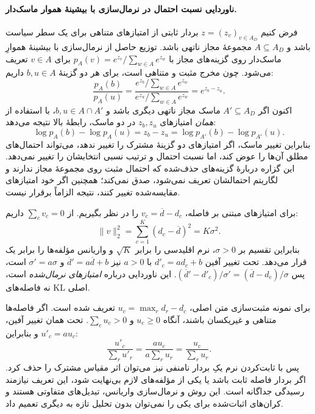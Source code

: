 \paragraph{ناوردایی نسبت احتمال در نرمال‌سازی با بیشینهٔ هموار ماسک‌دار.}
فرض کنیم $z=(z_v)_{v\in A_D}$ بردار ثابتی از امتیازهای متناهی
برای یک سطر سیاست باشد و $A\subseteq A_D$ مجموعهٔ مجاز ناتهی باشد.
توزیع حاصل از نرمال‌سازی با بیشینهٔ هموارِ ماسک‌دار روی گزینه‌های مجاز با
$p_A(v)=e^{z_v}/\sum_{w\in A}e^{z_w}$ برای $v\in A$
تعریف می‌شود. چون مخرج مثبت و متناهی است،
برای هر دو گزینهٔ $b,u\in A$ داریم:
\begin{equation}\label{eq:app-ch3-softmax-mask-ratio}
\frac{p_A(b)}{p_A(u)}
=\frac{e^{z_b}/\sum_{w\in A}e^{z_w}}
{e^{z_u}/\sum_{w\in A}e^{z_w}}
=e^{z_b-z_u}.
\end{equation}
اکنون اگر $A'\subseteq A_D$ ماسک مجاز ناتهی دیگری باشد
و $b,u\in A\cap A'$، با استفاده از \emph{همان} امتیازهای
$z_b,z_u$ در دو ماسک، رابطهٔ بالا نتیجه می‌دهد:
\[
\log p_A(b)-\log p_A(u)
=z_b-z_u
=\log p_{A'}(b)-\log p_{A'}(u).
\]
بنابراین تغییر ماسک، اگر امتیازهای دو گزینهٔ مشترک را تغییر ندهد،
می‌تواند احتمال‌های مطلق آن‌ها را عوض کند، اما نسبت احتمال و
ترتیب نسبی انتخابشان را تغییر نمی‌دهد.
این گزاره دربارهٔ گزینه‌های حذف‌شده که احتمال مثبت روی مجموعهٔ
مجاز ندارند و لگاریتم احتمالشان تعریف نمی‌شود، صدق نمی‌کند؛
همچنین اگر خود امتیازهای مقایسه‌شده تغییر کنند، نتیجه الزاماً برقرار نیست.

برای امتیازهای مبتنی بر فاصله، $v_c=\overline d-d_c$ را در نظر بگیریم. از $\sum_cv_c=0$ داریم:
\begin{equation}\label{eq:app-ch3-softmax-variance}
\|v\|_2^2=\sum_{c=1}^{K}(d_c-\overline d)^2=K\sigma^2.
\end{equation}
بنابراین تقسیم بر $\sigma>0$، نرم اقلیدسی را برابر $\sqrt K$ و واریانس مؤلفه‌ها را برابر یک قرار می‌دهد. تحت تغییر آفین $d'_c=ad_c+b$ با $a>0$ نیز
$\overline d'=a\overline d+b$ و $\sigma'=a\sigma$ است، پس
$(\overline d'-d'_c)/\sigma'=(\overline d-d_c)/\sigma$.
این ناوردایی درباره \emph{امتیازهای نرمال‌شده} است، نه فاصله‌های KL اصلی.

برای نمونه مثبت‌سازی متن اصلی، $u_c=\max_rd_r-d_c$ تعریف شده است. اگر فاصله‌ها متناهی و غیریکسان باشند، آنگاه $u_c\ge0$ و $\sum_cu_c>0$. تحت همان تغییر آفین، $u'_c=au_c$ و بنابراین:
\begin{equation}\label{eq:app-ch3-softmax-L1}
\frac{u'_c}{\sum_ru'_r}
=\frac{au_c}{a\sum_ru_r}
=\frac{u_c}{\sum_ru_r}.
\end{equation}
پس با ثابت‌کردن نرم یکِ بردار نامنفی نیز می‌توان اثر مقیاس مشترک را حذف کرد. اگر بردار فاصله ثابت باشد یا یکی از مؤلفه‌های لازم بی‌نهایت شود، این تعریف نیازمند رسیدگی جداگانه است. این روش و نرمال‌سازی واریانس، تبدیل‌های متفاوتی هستند و کران‌های اثبات‌شده برای یکی را نمی‌توان بدون تحلیل تازه به دیگری تعمیم داد.




